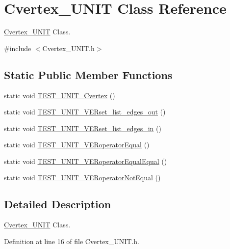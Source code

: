 \hypertarget{class_cvertex___u_n_i_t}{}\section{Cvertex\+\_\+\+U\+N\+I\+T Class Reference}
\label{class_cvertex___u_n_i_t}


\hyperlink{class_cvertex___u_n_i_t}{Cvertex\+\_\+\+U\+N\+I\+T} Class.  




{\ttfamily \#include $<$Cvertex\+\_\+\+U\+N\+I\+T.\+h$>$}

\subsection*{Static Public Member Functions}
\begin{DoxyCompactItemize}
\item 
static void \hyperlink{class_cvertex___u_n_i_t_a180500a0a1ef4a83ff7db304a6278c27}{T\+E\+S\+T\+\_\+\+U\+N\+I\+T\+\_\+\+Cvertex} ()
\item 
static void \hyperlink{class_cvertex___u_n_i_t_ae52d76300ef5ad6088e26fce58a00b60}{T\+E\+S\+T\+\_\+\+U\+N\+I\+T\+\_\+\+V\+E\+Rset\+\_\+list\+\_\+edges\+\_\+out} ()
\item 
static void \hyperlink{class_cvertex___u_n_i_t_aa3c8f7836c2d395c7a49cdc8027a6190}{T\+E\+S\+T\+\_\+\+U\+N\+I\+T\+\_\+\+V\+E\+Rset\+\_\+list\+\_\+edges\+\_\+in} ()
\item 
static void \hyperlink{class_cvertex___u_n_i_t_a4386de310ba0f1c7e0f2db85e96932db}{T\+E\+S\+T\+\_\+\+U\+N\+I\+T\+\_\+\+V\+E\+Roperator\+Equal} ()
\item 
static void \hyperlink{class_cvertex___u_n_i_t_a7206bfa963d8d30bd7be42208a0ceeb9}{T\+E\+S\+T\+\_\+\+U\+N\+I\+T\+\_\+\+V\+E\+Roperator\+Equal\+Equal} ()
\item 
static void \hyperlink{class_cvertex___u_n_i_t_acc3fd4993376726ecca3a2c0a117b787}{T\+E\+S\+T\+\_\+\+U\+N\+I\+T\+\_\+\+V\+E\+Roperator\+Not\+Equal} ()
\end{DoxyCompactItemize}


\subsection{Detailed Description}
\hyperlink{class_cvertex___u_n_i_t}{Cvertex\+\_\+\+U\+N\+I\+T} Class. 

Definition at line 16 of file Cvertex\+\_\+\+U\+N\+I\+T.\+h.



